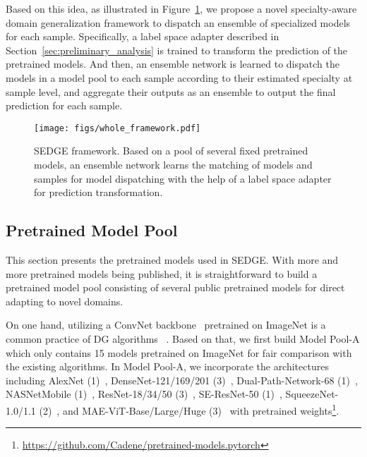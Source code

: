 \documentclass{article}
\newcommand{\method}{\textsc{SEDGE}\xspace}
\begin{document}
Based on this idea, as illustrated in Figure~\ref{fig:paradigm}, we propose a novel 
specialty-aware
domain generalization framework to dispatch an ensemble of specialized models for each sample.
Specifically, a label space adapter described in Section~\ref{sec:preliminary_analysis} is trained to transform the prediction of the pretrained models. 
And then, an ensemble network is learned to dispatch the models in a model pool to each sample according to their estimated specialty at sample level, and aggregate their outputs as an ensemble to output the final prediction for each sample.


\begin{figure}
    \begin{center}
    \texttt{[image: figs/whole\_framework.pdf]}
  \end{center}
  \caption{\method framework. 
  Based on a pool of several fixed pretrained models, an ensemble network learns the matching of models and samples for model dispatching with the help of a label space adapter for prediction transformation.
  }

  \label{fig:paradigm}
\end{figure}

\subsection{Pretrained Model Pool}\label{sec:pt-model-pool}



This section presents the pretrained models used in \method.
With more and more pretrained models being published,
it is straightforward to build a pretrained model pool consisting of several public pretrained models for direct adapting to novel domains.

On one hand, utilizing a ConvNet backbone~\citep{lecun2015deep} pretrained on ImageNet is a common practice of DG algorithms ~\citep{kim2021selfreg}.
Based on that, we first build Model Pool-A which only contains 15 models pretrained on ImageNet 
for fair comparison with the existing algorithms. 
In Model Pool-A, we incorporate the architectures including AlexNet (1)~\citep{krizhevsky2012imagenet}, DenseNet-121/169/201 (3)~\citep{iandola2014densenet}, Dual-Path-Network-68 (1)~\citep{chen2017dual}, NASNetMobile (1)~\citep{zoph2018learning}, ResNet-18/34/50 (3)~\citep{he2016deep}, SE-ResNet-50 (1)~\citep{hu2018squeeze}, SqueezeNet-1.0/1.1 (2)~\citep{iandola2016squeezenet}, and MAE-ViT-Base/Large/Huge (3)~\citep{he2021masked} with pretrained weights\footnote{\url{https://github.com/Cadene/pretrained-models.pytorch}}. 
\end{document}
